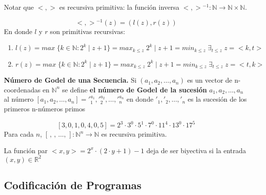 \begin{observation}
Notar que $<, >$ es recursiva primitiva: la funci\'on inversa ${<, >}^{- 1} \colon \mathbb{N} \to \mathbb{N} \times \mathbb{N}$.
 
\[
{<, >}^{- 1}(z) = (l(z), r(z))
\]
\noindent
En donde $l$ y $r$ son primitivas recursivas:
\begin{enumerate}
	\item[] $l(z) = max \; \{ k \in \mathbb{N} : 2^k \mid z + 1 \} = max_{k \leq z} \; 2^k \mid z + 1 = min_{k \leq z} \; \exists_{t \leq z} \; z = <k, t>$
	\item[] $r(z) = max \; \{ k \in \mathbb{N} : 2^k \mid z + 1 \} = max_{k \leq z} \; 2^k \mid z + 1 = min_{k \leq z} \; \exists_{t \leq z} \; z = <t, k>$
\end{enumerate}
 
\end{observation}
\noindent
\textbf{N\'umero de Godel de una Secuencia.} Si $(a_1, a_2, \ldots, a_n)$ es un vector de n-coordenadas en $\mathbb{N}^n$ se define \textbf{el n\'umero de Godel de la sucesi\'on }$a_1, a_2, \ldots, a_n$ al n\'umero $[a_1, a_2, \ldots, a_n] = \prime_{1}^{a_1}, \prime_{2}^{a_2}, \ldots, \prime_{n}^{a_n}$ en donde $\prime_1, \prime_2, \ldots, \prime_n$ es la sucesi\'on de los primeros n-n\'umeros primos
 
\begin{example}
\[
[3, 0, 1, 0, 4, 0, 5] = 2^3 \cdot 3^0 \cdot 5^1 \cdot 7^0 \cdot 11^4 \cdot 13^0 \cdot 17^5
\]
Para cada $n$, $[\, , \, , \, \ldots , \,] \colon \mathbb{N}^n \to \mathbb{N}$ es recursiva primitiva.
\end{example}
 
\begin{observation}
La funci\'on par $<x, y> = 2^{x} \cdot (2 \cdot y + 1) - 1$ deja de ser biyectiva si la entrada $(x, y) \in \mathbb{R}^2$
\end{observation}
 
\subsection{Codificaci\'on de Programas}
 
